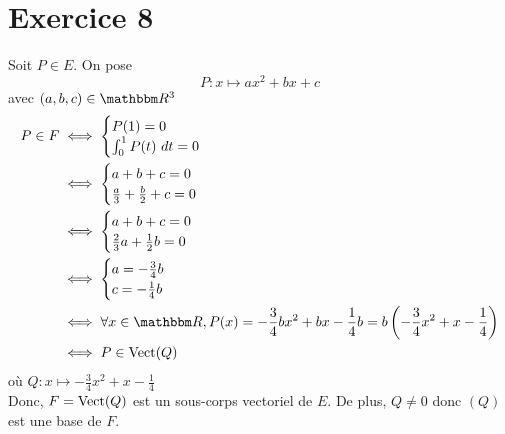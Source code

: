 \part{Exercice 8}
Soit $P \in E$. On pose \[
	P : x \mapsto  ax^2 + bx + c
\] avec $(a,b,c) \in \R^3$ 
\begin{align*}
	P \in F &\iff \begin{cases}
		P(1) = 0\\
		\int_{0}^{1} P(t)~dt = 0
	\end{cases}\\
	&\iff \begin{cases}
		a+b+c = 0\\
		\frac{a}{3}+ \frac{b}{2}+ c = 0
	\end{cases}\\
	&\iff \begin{cases}
		a+b+c = 0\\
		\frac{2}{3}a+\frac{1}{2}b = 0
	\end{cases}\\
	&\iff \begin{cases}
		a=  -\frac{3}{4}b\\
		c = -\frac{1}{4}b
	\end{cases}\\
	&\iff\forall x\in \R, P(x) = -\frac{3}{4}bx^2 + bx - \frac{1}{4}b = b\left( -\frac{3}{4}x^2 + x - \frac{1}{4} \right)\\
	&\iff P \in \Vect(Q)
\end{align*}
où $Q: x \mapsto -\frac{3}{4}x^2 + x - \frac{1}{4}$ \\
Donc, $F = \operatorname{Vect}(Q)$ est un sous-corps vectoriel de $E$. De plus, $Q \neq 0$ donc $(Q)$ est une base de $F$.
